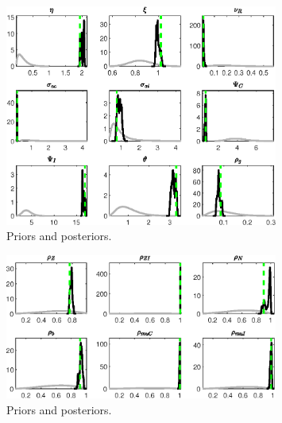 \begin{figure}[H]
\centering
\includegraphics[width=0.80\textwidth]{BRS_sectoral_wo_demand_shocks/Output/BRS_sectoral_wo_demand_shocks_PriorsAndPosteriors3}
\caption{Priors and posteriors.}\label{Fig:PriorsAndPosteriors:3}
\end{figure}
 
\begin{figure}[H]
\centering
\includegraphics[width=0.80\textwidth]{BRS_sectoral_wo_demand_shocks/Output/BRS_sectoral_wo_demand_shocks_PriorsAndPosteriors4}
\caption{Priors and posteriors.}\label{Fig:PriorsAndPosteriors:4}
\end{figure}
 
